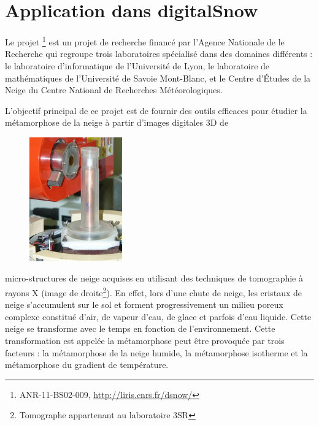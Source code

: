 %
\section{Application dans digitalSnow}%
\label{sec:applications:digitalsnow}
%
Le projet \digitalSnow\footnote{ANR-11-BS02-009, \url{http://liris.cnrs.fr/dsnow/}} est un projet de recherche financé par l'Agence Nationale de le
Recherche qui regroupe trois laboratoires spécialisé dans des domaines
différents : le laboratoire d'informatique \textsc{} de l'Université de
Lyon, le laboratoire de mathématiques \textsc{} de l'Université de Savoie
Mont-Blanc, et le Centre d'Études de la Neige \textsc{} du Centre National de
Recherches Météorologiques.


L'objectif principal de ce projet est de fournir des outils efficaces pour
étudier la métamorphose de la neige à partir d'images digitales 3D de
%
\begin{figure}
	\includegraphics[width=4cm]{images/digitalSnow/YTEjpE}
\end{figure}
%
micro-structures de neige acquises en utilisant des techniques de tomographie à
rayons X (image de droite\footnote{Tomographe appartenant au laboratoire 3SR}). En
effet, lors d'une chute de neige, les cristaux de neige s'accumulent sur le sol
et forment progressivement un milieu poreux complexe constitué d'air, de vapeur
d'eau, de glace et parfois d'eau liquide. Cette neige se transforme avec le
temps en fonction de l'environnement. Cette transformation est appelée la
métamorphose peut être provoquée par trois facteurs : la métamorphose de la
neige humide, la métamorphose isotherme et la métamorphose du gradient de
température.



